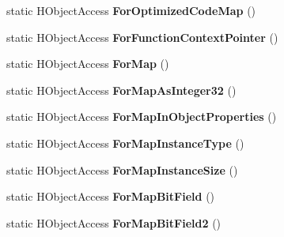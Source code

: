 \begin{DoxyCompactItemize}
\item 
\hypertarget{classv8_1_1internal_1_1_v8___f_i_n_a_l_af34cdae94206d87ee6144a63bd06d20a}{}static H\+Object\+Access {\bfseries For\+Optimized\+Code\+Map} ()\label{classv8_1_1internal_1_1_v8___f_i_n_a_l_af34cdae94206d87ee6144a63bd06d20a}

\item 
\hypertarget{classv8_1_1internal_1_1_v8___f_i_n_a_l_a891534bb1e0b5df29cb33882647350f1}{}static H\+Object\+Access {\bfseries For\+Function\+Context\+Pointer} ()\label{classv8_1_1internal_1_1_v8___f_i_n_a_l_a891534bb1e0b5df29cb33882647350f1}

\item 
\hypertarget{classv8_1_1internal_1_1_v8___f_i_n_a_l_ad606ce8a14e3886362977c837be21a74}{}static H\+Object\+Access {\bfseries For\+Map} ()\label{classv8_1_1internal_1_1_v8___f_i_n_a_l_ad606ce8a14e3886362977c837be21a74}

\item 
\hypertarget{classv8_1_1internal_1_1_v8___f_i_n_a_l_a643a2af7d083965fbef3e56408097a86}{}static H\+Object\+Access {\bfseries For\+Map\+As\+Integer32} ()\label{classv8_1_1internal_1_1_v8___f_i_n_a_l_a643a2af7d083965fbef3e56408097a86}

\item 
\hypertarget{classv8_1_1internal_1_1_v8___f_i_n_a_l_a46bde566cbceb02b56f00139e3e3f802}{}static H\+Object\+Access {\bfseries For\+Map\+In\+Object\+Properties} ()\label{classv8_1_1internal_1_1_v8___f_i_n_a_l_a46bde566cbceb02b56f00139e3e3f802}

\item 
\hypertarget{classv8_1_1internal_1_1_v8___f_i_n_a_l_afb8febcb33deeb1fa244cb0d7c74f3ed}{}static H\+Object\+Access {\bfseries For\+Map\+Instance\+Type} ()\label{classv8_1_1internal_1_1_v8___f_i_n_a_l_afb8febcb33deeb1fa244cb0d7c74f3ed}

\item 
\hypertarget{classv8_1_1internal_1_1_v8___f_i_n_a_l_a624c531eb9d680b505d56d63efc195e7}{}static H\+Object\+Access {\bfseries For\+Map\+Instance\+Size} ()\label{classv8_1_1internal_1_1_v8___f_i_n_a_l_a624c531eb9d680b505d56d63efc195e7}

\item 
\hypertarget{classv8_1_1internal_1_1_v8___f_i_n_a_l_a508df6b405fece9b08e164e3a70e32a6}{}static H\+Object\+Access {\bfseries For\+Map\+Bit\+Field} ()\label{classv8_1_1internal_1_1_v8___f_i_n_a_l_a508df6b405fece9b08e164e3a70e32a6}

\item 
\hypertarget{classv8_1_1internal_1_1_v8___f_i_n_a_l_aaee0b2be89800a441fc74bb2b4f06571}{}static H\+Object\+Access {\bfseries For\+Map\+Bit\+Field2} ()\label{classv8_1_1internal_1_1_v8___f_i_n_a_l_aaee0b2be89800a441fc74bb2b4f06571}


\end{DoxyCompactItemize}
